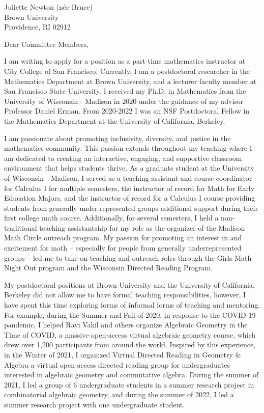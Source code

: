 \documentclass[11pt]{brownletter}
\date{October 14, 2023} %
\begin{document}
\begin{letter}{Juliette Newton (n\'{e}e Bruce)\\ 
               Brown University\\ 
               Providence, RI 02912}

\opening{Dear Committee Members,}

I am writing to apply for a position as a part-time mathematics instructor at City College of San Francisco. Currently, I am a postdoctoral researcher in the Mathematics Department at Brown University, and a lecturer faculty member at San Francisco State University. I received my Ph.D. in Mathematics from the University of Wisconsin - Madison in 2020 under the guidance of my advisor Professor Daniel Erman. From 2020-2022 I was an NSF Postdoctoral Fellow in the Mathematics Department at the University of California, Berkeley.

I am passionate about promoting inclusivity, diversity, and justice in the mathematics community. This passion extends throughout my teaching where I am dedicated to creating an interactive, engaging, and supportive classroom environment that helps students thrive. As a graduate student at the University of Wisconsin - Madison, I served as a teaching assistant and course coordinator for Calculus I for multiple semesters, the instructor of record for Math for Early Education Majors, and the instructor of record for a Calculus I course providing students from generally under-represented groups additional support during their first college math course. Additionally, for several semesters, I held a non-traditional teaching assistantship for my role as the organizer of the Madison Math Circle outreach program. My passion for promoting an interest in and excitement for math – especially for people from generally underrepresented groups – led me to take on teaching and outreach roles through the Girls Math Night Out program and the Wisconsin Directed Reading Program.

My postdoctoral positions at Brown University and the University of California, Berkeley did not allow me to have formal teaching responsibilities, however, I have spent this time exploring forms of informal forms of teaching and mentoring. For example, during the Summer and Fall of 2020, in response to the COVID-19 pandemic, I helped Ravi Vakil and others organize Algebraic Geometry in the Time of COVID, a massive open-access virtual algebraic geometry course, which drew over 1,200 participants from around the world. Inspired by this experience, in the Winter of 2021, I organized Virtual Directed Reading in Geometry \& Algebra a virtual open-access directed reading group for undergraduates interested in algebraic geometry and commutative algebra. During the summer of 2021, I led a group of 6 undergraduate students in a summer research project in combinatorial algebraic geometry, and during the summer of 2022, I led a summer research project with one undergraduate student.


\end{letter}
\end{document}
